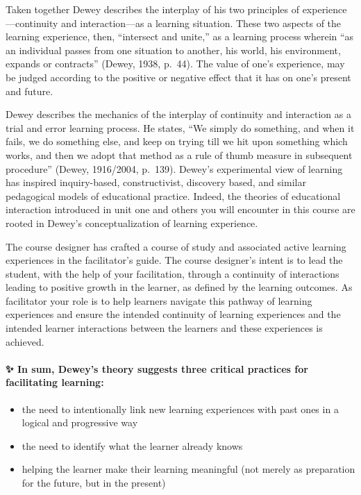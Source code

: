 \documentclass[
]{book}
\providecommand{\tightlist}{%
  \setlength{\itemsep}{0pt}\setlength{\parskip}{0pt}}
\begin{document}
Taken together Dewey describes the interplay of his two principles of experience---continuity and interaction---as a learning situation. These two aspects of the learning experience, then, ``intersect and unite,'' as a learning process wherein ``as an individual passes from one situation to another, his world, his environment, expands or contracts'' (Dewey, 1938, p.~44). The value of one's experience, may be judged according to the positive or negative effect that it has on one's present and future.

Dewey describes the mechanics of the interplay of continuity and interaction as a trial and error learning process. He states, ``We simply do something, and when it fails, we do something else, and keep on trying till we hit upon something which works, and then we adopt that method as a rule of thumb measure in subsequent procedure'' (Dewey, 1916/2004, p.~139). Dewey's experimental view of learning has inspired inquiry-based, constructivist, discovery based, and similar pedagogical models of educational practice. Indeed, the theories of educational interaction introduced in unit one and others you will encounter in this course are rooted in Dewey's conceptualization of learning experience.

The course designer has crafted a course of study and associated active learning experiences in the facilitator's guide. The course designer's intent is to lead the student, with the help of your facilitation, through a continuity of interactions leading to positive growth in the learner, as defined by the learning outcomes. As facilitator your role is to help learners navigate this pathway of learning experiences and ensure the intended continuity of learning experiences and the intended learner interactions between the learners and these experiences is achieved.

\begin{protip}
\hypertarget{in-sum-deweys-theory-suggests-three-critical-practices-for-facilitating-learning}{%
\paragraph{✨ In sum, Dewey's theory suggests three critical practices
for facilitating
learning:}\label{in-sum-deweys-theory-suggests-three-critical-practices-for-facilitating-learning}}

\begin{itemize}
\tightlist
\item
  the need to intentionally link new learning experiences with past ones
  in a logical and progressive way\\
\item
  the need to identify what the learner already knows\\
\item
  helping the learner make their learning meaningful (not merely as
  preparation for the future, but in the present)
\end{itemize}
\end{protip}
\end{document}
